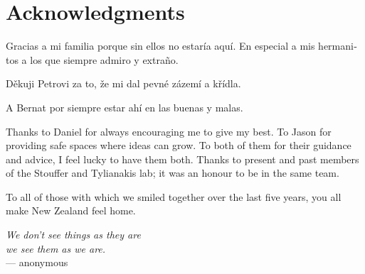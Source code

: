 {}
\chapter*{Acknowledgments}

\begin{otherlanguage}{spanish}
Gracias a mi familia porque sin ellos no estaría aquí.
En especial a mis hermanitos a los que siempre admiro y extraño.
\end{otherlanguage}
\begin{otherlanguage}{spanish}
Děkuji Petrovi za to, že mi dal pevné zázemí a křídla.
\end{otherlanguage}
\begin{otherlanguage}{spanish}
A Bernat por siempre estar ahí en las buenas y malas.
\end{otherlanguage}

Thanks to Daniel for always encouraging me to give my best.
To Jason for providing safe spaces where ideas can grow.
To both of them for their guidance and advice, I feel lucky to have them both.
Thanks to present and past members of the Stouffer and Tylianakis lab; it was an honour to be in the same team.

To all of those with which we smiled together over the last five years, you all make New Zealand feel home.

\begin{flushright}{\slshape
    We don't see things as they are \\
    we see them as we are.} \\ \medskip
    --- anonymous
\end{flushright}

\bigskip
